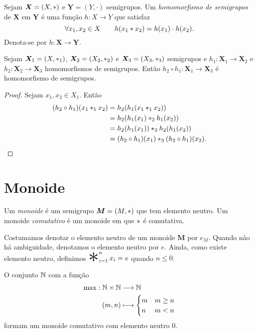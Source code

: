 \begin{defi}
	Sejam $\bm X=(X, \ast )$ e $\bm Y=(Y,\cdot)$ semigrupos. Um \emph{homomorfismo de semigrupos} de $\bm X$ em $\bm Y$ é uma função $h: X \to Y$ que satisfaz
	\begin{equation*}
	\forall x_1,x_2 \in X \qquad h(x_1  \ast  x_2)=h(x_1) \cdot h(x_2).
	\end{equation*}
\noindent Denota-se por $h: \bm X \to \bm Y$. %
\end{defi}

\begin{prop}
\label{comp.hom.sem}
	Sejam $\bm X_1=(X, \ast _1)$, $\bm X_2=(X_2, \ast _2)$ e $\bm X_3=(X_3, \ast _3)$ semigrupos e $h_1: \bm X_1 \to \bm X_2$ e $h_2: \bm X_2 \to \bm X_3$ homomorfismos de semigrupos. Então $h_2 \circ h_1: \bm X_1 \to \bm X_3$ é homomorfismo de semigrupos.
\end{prop}
\begin{proof}
	Sejam $x_1,x_2 \in X_1$. Então
	\begin{align*}
	(h_2 \circ h_1)(x_1  \ast _1 x_2) &= h_2(h_1(x_1  \ast _1 x_2)) \\
		&= h_2(h_1(x_1)  \ast _2 h_1(x_2)) \\
		&= h_2(h_1 (x_1))  \ast _3 h_2(h_1(x_2)) \\
		&= (h_2 \circ h_1)(x_1)  \ast _3 (h_2 \circ h_1)(x_2).
	\end{align*}
\end{proof}

\section{Monoide}

\begin{defi}
	Um \emph{monoide} é um semigrupo $\bm M=(M, \ast )$ que tem elemento neutro. Um monoide \emph{comutativo} é um monoide em que $ \ast $ é comutativa.
\end{defi}

\begin{nota}
	Costumamos denotar o elemento neutro de um monoide $\bm M$ por $e_M$. Quando não há ambiguidade, denotamos o elemento neutro por $e$. Ainda, como existe elemento neutro, definimos $\bigopb_{i=1}^n x_i = e$ quando $n\leq 0$.
\end{nota}

\begin{ex}
	O conjunto $\mathbb{N}$ com a função
	\begin{align*}
	\max: \mathbb{N} \times \mathbb{N} &\longrightarrow \mathbb{N} \\
		(m,n) &\longmapsto
			\begin{cases}
			m 	& m \geq n \\
			n 		& m<n
			\end{cases}
	\end{align*}
formam um monoide comutativo com elemento neutro 0.
\end{ex}


